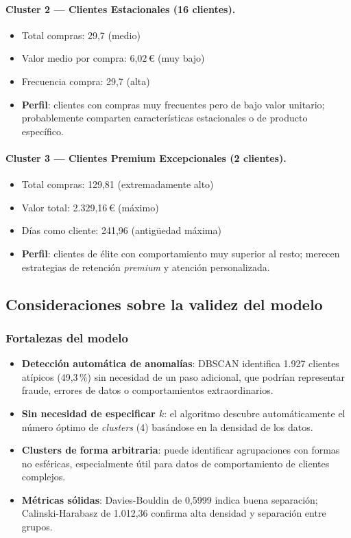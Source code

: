 \documentclass[11pt,a4paper]{article}
\begin{document}
\paragraph{Cluster 2 — Clientes Estacionales (16 clientes).}
\begin{itemize}
    \item Total compras: 29,7 (medio)
    \item Valor medio por compra: 6,02\,€ (muy bajo)
    \item Frecuencia compra: 29,7 (alta)
    \item \textbf{Perfil}: clientes con compras muy frecuentes pero de bajo valor unitario; probablemente comparten características estacionales o de producto específico.
\end{itemize}

\paragraph{Cluster 3 — Clientes Premium Excepcionales (2 clientes).}
\begin{itemize}
    \item Total compras: 129,81 (extremadamente alto)
    \item Valor total: 2.329,16\,€ (máximo)
    \item Días como cliente: 241,96 (antigüedad máxima)
    \item \textbf{Perfil}: clientes de élite con comportamiento muy superior al resto; merecen estrategias de retención \textit{premium} y atención personalizada.
\end{itemize}

\subsection{Consideraciones sobre la validez del modelo}

\subsubsection{Fortalezas del modelo}

\begin{itemize}
    \item \textbf{Detección automática de anomalías}: DBSCAN identifica 1.927 clientes atípicos (49,3\,\%) sin necesidad de un paso adicional, que podrían representar fraude, errores de datos o comportamientos extraordinarios.
    \item \textbf{Sin necesidad de especificar $k$}: el algoritmo descubre automáticamente el número óptimo de \textit{clusters} (4) basándose en la densidad de los datos.
    \item \textbf{Clusters de forma arbitraria}: puede identificar agrupaciones con formas no esféricas, especialmente útil para datos de comportamiento de clientes complejos.
    \item \textbf{Métricas sólidas}: Davies-Bouldin de 0,5999 indica buena separación; Calinski-Harabasz de 1.012,36 confirma alta densidad y separación entre grupos.
\end{itemize}
\end{document}

